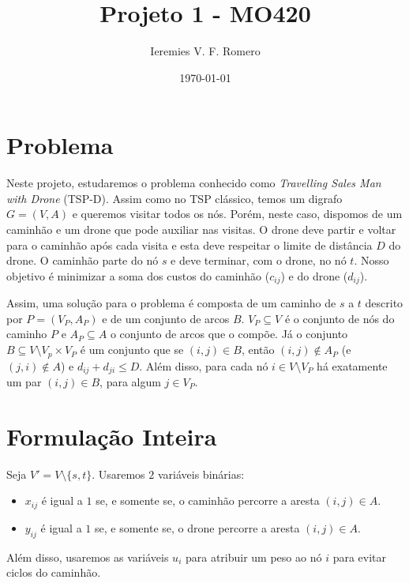 \documentclass[11pt]{article}
\author{Ieremies V. F. Romero}
\date{\today}
\title{Projeto 1 - MO420}
\begin{document}
\maketitle

\section{Problema}
\label{sec:orgd53b207}
Neste projeto, estudaremos o problema conhecido como \emph{Travelling Sales Man with Drone} (TSP-D). Assim como no TSP clássico, temos um digrafo \(G = (V,A)\) e queremos visitar todos os nós. Porém, neste caso, dispomos de um caminhão e um drone que pode auxiliar nas visitas. O drone deve partir e voltar para o caminhão após cada visita e esta deve respeitar o limite de distância \(D\) do drone. O caminhão parte do nó \(s\) e deve terminar, com o drone, no nó \(t\). Nosso objetivo é minimizar a soma dos custos do caminhão (\(c_{ij}\)) e do drone (\(d_{ij}\)).

Assim, uma solução para o problema é composta de um caminho de \(s\) a \(t\) descrito por \(P = (V_P, A_P)\) e de um conjunto de arcos \(B\). \(V_P \subseteq V\) é o conjunto de nós do caminho \(P\) e \(A_P \subseteq A\) o conjunto de arcos que o compõe. Já o conjunto \(B \subseteq V \setminus V_p \times V_P\) é um conjunto que se \((i,j) \in B\), então \((i,j) \notin A_P\) (e \((j,i) \notin A\)) e \(d_{ij} + d_{ji} \leq D\). Além disso, para cada nó \(i \in V \setminus V_P\) há exatamente um par \((i,j) \in B\), para algum \(j \in V_P\).

\section{Formulação Inteira}
\label{sec:org73f3907}
Seja \(V' = V \setminus \{s,t\}\). Usaremos \(2\) variáveis binárias:
\begin{itemize}
\item \(x_{ij}\) é igual a \(1\) se, e somente se, o caminhão percorre a aresta \((i,j) \in A\).
\item \(y_{ij}\) é igual a \(1\) se, e somente se, o drone percorre a aresta \((i,j) \in A\).
\end{itemize}

Além disso, usaremos as variáveis \(u_i\) para atribuir um peso ao nó \(i\) para evitar ciclos do caminhão.
\end{document}
